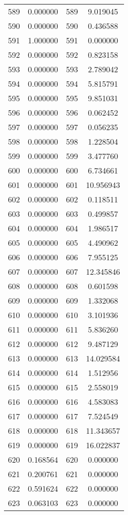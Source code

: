\documentclass[12pt]{article}
\begin{document}
\begin{longtable}{@{}cccc@{}}
589 & 0.000000 & 589 & 9.019045 \\
590 & 0.000000 & 590 & 0.436588 \\
591 & 1.000000 & 591 & 0.000000 \\
592 & 0.000000 & 592 & 0.823158 \\
593 & 0.000000 & 593 & 2.789042 \\
594 & 0.000000 & 594 & 5.815791 \\
595 & 0.000000 & 595 & 9.851031 \\
596 & 0.000000 & 596 & 0.062452 \\
597 & 0.000000 & 597 & 0.056235 \\
598 & 0.000000 & 598 & 1.228504 \\
599 & 0.000000 & 599 & 3.477760 \\
600 & 0.000000 & 600 & 6.734661 \\
601 & 0.000000 & 601 & 10.956943 \\
602 & 0.000000 & 602 & 0.118511 \\
603 & 0.000000 & 603 & 0.499857 \\
604 & 0.000000 & 604 & 1.986517 \\
605 & 0.000000 & 605 & 4.490962 \\
606 & 0.000000 & 606 & 7.955125 \\
607 & 0.000000 & 607 & 12.345846 \\
608 & 0.000000 & 608 & 0.601598 \\
609 & 0.000000 & 609 & 1.332068 \\
610 & 0.000000 & 610 & 3.101936 \\
611 & 0.000000 & 611 & 5.836260 \\
612 & 0.000000 & 612 & 9.487129 \\
613 & 0.000000 & 613 & 14.029584 \\
614 & 0.000000 & 614 & 1.512956 \\
615 & 0.000000 & 615 & 2.558019 \\
616 & 0.000000 & 616 & 4.583083 \\
617 & 0.000000 & 617 & 7.524549 \\
618 & 0.000000 & 618 & 11.343657 \\
619 & 0.000000 & 619 & 16.022837 \\
620 & 0.168564 & 620 & 0.000000 \\
621 & 0.200761 & 621 & 0.000000 \\
622 & 0.591624 & 622 & 0.000000 \\
623 & 0.063103 & 623 & 0.000000 \\

\end{longtable}
\end{document}

